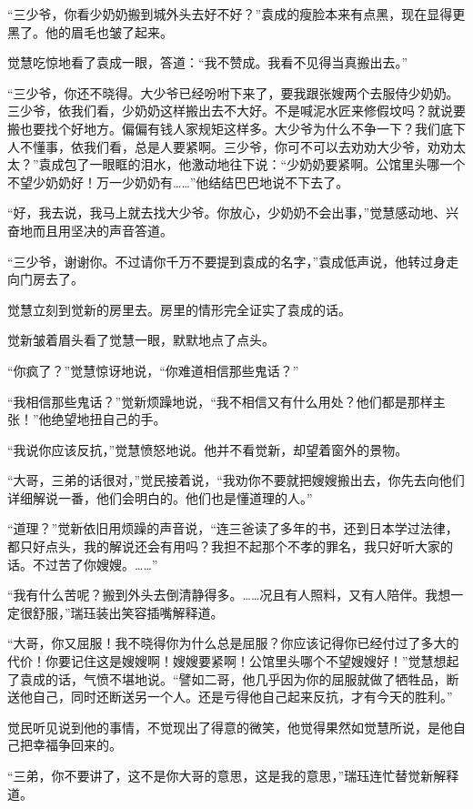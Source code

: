 \par “三少爷，你看少奶奶搬到城外头去好不好？”袁成的瘦脸本来有点黑，现在显得更黑了。他的眉毛也皱了起来。
\par 觉慧吃惊地看了袁成一眼，答道：“我不赞成。我看不见得当真搬出去。”
\par “三少爷，你还不晓得。大少爷已经吩咐下来了，要我跟张嫂两个去服侍少奶奶。三少爷，依我们看，少奶奶这样搬出去不大好。不是喊泥水匠来修假坟吗？就说要搬也要找个好地方。偏偏有钱人家规矩这样多。大少爷为什么不争一下？我们底下人不懂事，依我们看，总是人要紧啊。三少爷，你可不可以去劝劝大少爷，劝劝太太？”袁成包了一眼眶的泪水，他激动地往下说：“少奶奶要紧啊。公馆里头哪一个不望少奶奶好！万一少奶奶有……”他结结巴巴地说不下去了。
\par “好，我去说，我马上就去找大少爷。你放心，少奶奶不会出事，”觉慧感动地、兴奋地而且用坚决的声音答道。
\par “三少爷，谢谢你。不过请你千万不要提到袁成的名字，”袁成低声说，他转过身走向门房去了。
\par 觉慧立刻到觉新的房里去。房里的情形完全证实了袁成的话。
\par 觉新皱着眉头看了觉慧一眼，默默地点了点头。
\par “你疯了？”觉慧惊讶地说，“你难道相信那些鬼话？”
\par “我相信那些鬼话？”觉新烦躁地说，“我不相信又有什么用处？他们都是那样主张！”他绝望地扭自己的手。
\par “我说你应该反抗，”觉慧愤怒地说。他并不看觉新，却望着窗外的景物。
\par “大哥，三弟的话很对，”觉民接着说，“我劝你不要就把嫂嫂搬出去，你先去向他们详细解说一番，他们会明白的。他们也是懂道理的人。”
\par “道理？”觉新依旧用烦躁的声音说，“连三爸读了多年的书，还到日本学过法律，都只好点头，我的解说还会有用吗？我担不起那个不孝的罪名，我只好听大家的话。不过苦了你嫂嫂。……”
\par “我有什么苦呢？搬到外头去倒清静得多。……况且有人照料，又有人陪伴。我想一定很舒服，”瑞珏装出笑容插嘴解释道。
\par “大哥，你又屈服！我不晓得你为什么总是屈服？你应该记得你已经付过了多大的代价！你要记住这是嫂嫂啊！嫂嫂要紧啊！公馆里头哪个不望嫂嫂好！”觉慧想起了袁成的话，气愤不堪地说。“譬如二哥，他几乎因为你的屈服就做了牺牲品，断送他自己，同时还断送另一个人。还是亏得他自己起来反抗，才有今天的胜利。”
\par 觉民听见说到他的事情，不觉现出了得意的微笑，他觉得果然如觉慧所说，是他自己把幸福争回来的。
\par “三弟，你不要讲了，这不是你大哥的意思，这是我的意思，”瑞珏连忙替觉新解释道。
